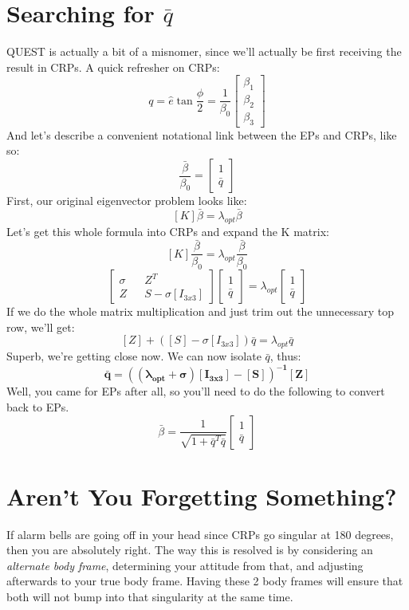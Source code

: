\documentclass[a4paper,14pt]{extreport}
\begin{document}
\section{Searching for \(\bar{q}\)}
QUEST is actually a bit of a misnomer, since we'll actually be first receiving the result in CRPs. A quick refresher on CRPs:
\[
q = \hat{e} \tan{\dfrac{\phi}{2}} = 
\dfrac{1}{\beta_0 }
\begin{bmatrix}
\beta_1\\
\beta_2\\
\beta_3
\end{bmatrix}
\]
And let's describe a convenient notational link between the EPs and CRPs, like so:
\[
\dfrac{\bar{\beta}}{\beta_0} = 
\begin{bmatrix}
1\\\bar{q} 
\end{bmatrix}
\]
First, our original eigenvector problem looks like:
\[
[K]\bar{\beta} = \lambda_{opt}\bar{\beta}
\]
Let's get this whole formula into CRPs and expand the K matrix:
\[
[K]\dfrac{\bar{\beta}}{\beta_0} = \lambda_{opt}\dfrac{\bar{\beta}}{\beta_0}
\]
\[
\begin{bmatrix}
\sigma&&Z^T\\
Z&&S-\sigma[I_{3x3}]
\end{bmatrix}
\begin{bmatrix}
1\\\bar{q} 
\end{bmatrix} = \lambda_{opt}
\begin{bmatrix}
1\\\bar{q} 
\end{bmatrix}
\]
If we do the whole matrix multiplication and just trim out the unnecessary top row, we'll get:
\[
[Z] + ([S] - \sigma [I_{3x3}])\bar{q} = \lambda_{opt}\bar{q}
\]
Superb, we're getting close now. We can now isolate $\bar{q}$, thus:
\[
\mathbf{
\bar{q} = ((\lambda_{opt}+\sigma)[I_{3x3}] - [S])^{-1}[Z]
}
\]
Well, you came for EPs after all, so you'll need to do the following to convert back to EPs.
\[
\bar{\beta} = \dfrac{1}{\sqrt{1+\bar{q}^T\bar{q}}} 
\begin{bmatrix}
1\\\bar{q} 
\end{bmatrix}
\]
\section{Aren't You Forgetting Something?}
If alarm bells are going off in your head since CRPs go singular at 180 degrees, then you are absolutely right. The way this is resolved is by considering an \emph{alternate body frame}, determining your attitude from that, and adjusting afterwards to your true body frame. Having these 2 body frames will ensure that both will not bump into that singularity at the same time. 
\end{document}
